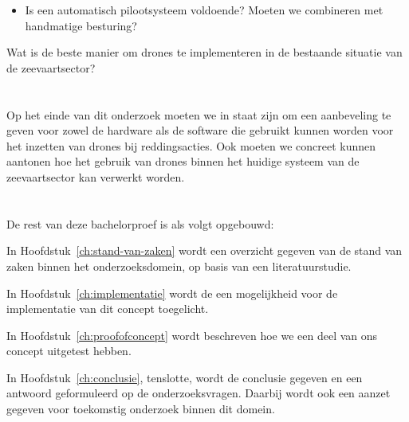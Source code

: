 \begin{itemize}
	\item Is een automatisch pilootsysteem voldoende? Moeten we combineren met handmatige besturing?
\end{itemize}

Wat is de beste manier om drones te implementeren in de bestaande situatie van de zeevaartsector?

\section{}
\label{sec:onderzoeksdoelstelling}

Op het einde van dit onderzoek moeten we in staat zijn om een aanbeveling te geven voor zowel de hardware als de software die gebruikt kunnen worden voor het inzetten van drones bij reddingsacties. Ook moeten we concreet kunnen aantonen hoe het gebruik van drones binnen het huidige systeem van de zeevaartsector kan verwerkt worden.

\section{}
\label{sec:opzet-bachelorproef}


De rest van deze bachelorproef is als volgt opgebouwd:

In Hoofdstuk~\ref{ch:stand-van-zaken} wordt een overzicht gegeven van de stand van zaken binnen het onderzoeksdomein, op basis van een literatuurstudie.

In Hoofdstuk~\ref{ch:implementatie} wordt de een mogelijkheid voor de implementatie van dit concept toegelicht.

In Hoofdstuk~\ref{ch:proofofconcept} wordt beschreven hoe we een deel van ons concept uitgetest hebben.


In Hoofdstuk~\ref{ch:conclusie}, tenslotte, wordt de conclusie gegeven en een antwoord geformuleerd op de onderzoeksvragen. Daarbij wordt ook een aanzet gegeven voor toekomstig onderzoek binnen dit domein.